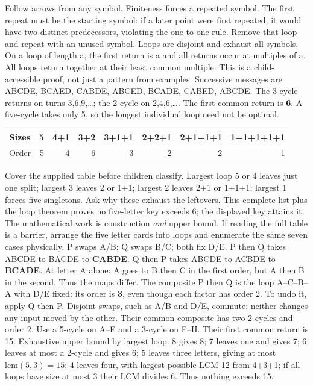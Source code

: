 \documentclass[12pt]{extarticle}
\begin{document}
Follow arrows from any symbol. Finiteness forces a repeated symbol. The first repeat must be the starting symbol: if a later point were first repeated, it would have two distinct predecessors, violating the one-to-one rule. Remove that loop and repeat with an unused symbol. Loops are disjoint and exhaust all symbols. On a loop of length a, the first return is a and all returns occur at multiples of a. All loops return together at their least common multiple. This is a child-accessible proof, not just a pattern from examples.
\newpage
{}
Successive messages are ABCDE, BCAED, CABDE, ABCED, BCADE, CABED, ABCDE. The 3-cycle returns on turns 3,6,9,\ldots; the 2-cycle on 2,4,6,\ldots. The first common return is \textbf{6}. A five-cycle takes only 5, so the longest individual loop need not be optimal.
\begin{center}\renewcommand{\arraystretch}{1.3}\begin{tabular}{c|rrrrrrr}Sizes&5&4+1&3+2&3+1+1&2+2+1&2+1+1+1&1+1+1+1+1\\\hline Order&5&4&6&3&2&2&1\end{tabular}\end{center}
Cover the supplied table before children classify. Largest loop 5 or 4 leaves just one split; largest 3 leaves 2 or 1+1; largest 2 leaves 2+1 or 1+1+1; largest 1 forces five singletons. Ask why these exhaust the leftovers. This complete list plus the loop theorem proves no five-letter key exceeds 6; the displayed key attains it. The mathematical work is construction \emph{and} upper bound. If reading the full table is a barrier, arrange the five letter cards into loops and enumerate the same seven cases physically.
P swaps A/B; Q swaps B/C; both fix D/E. P then Q takes ABCDE to BACDE to \textbf{CABDE}. Q then P takes ABCDE to ACBDE to \textbf{BCADE}. At letter A alone: A goes to B then C in the first order, but A then B in the second. Thus the maps differ.
The composite P then Q is the loop A--C--B--A with D/E fixed: its order is \textbf{3}, even though each factor has order 2. To undo it, apply Q then P. Disjoint swaps, such as A/B and D/E, commute: neither changes any input moved by the other. Their common composite has two 2-cycles and order 2.
Use a 5-cycle on A--E and a 3-cycle on F--H. Their first common return is 15. Exhaustive upper bound by largest loop: 8 gives 8; 7 leaves one and gives 7; 6 leaves at most a 2-cycle and gives 6; 5 leaves three letters, giving at most \(\mathrm{lcm}(5,3)=15\); 4 leaves four, with largest possible LCM 12 from 4+3+1; if all loops have size at most 3 their LCM divides 6. Thus nothing exceeds 15.
\end{document}
